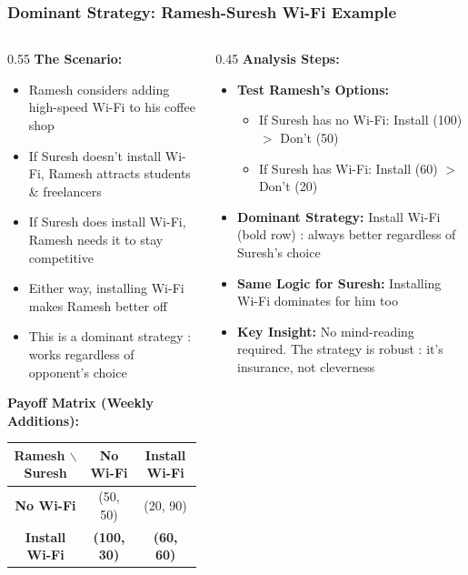 \begin{frame}[fragile]\frametitle{Dominant Strategy: Ramesh-Suresh Wi-Fi Example}
\begin{columns}
    \begin{column}[T]{0.55\linewidth}
      \textbf{The Scenario:}
      \begin{itemize}
        \item Ramesh considers adding high-speed Wi-Fi to his coffee shop
        \item If Suresh doesn't install Wi-Fi, Ramesh attracts students \& freelancers
        \item If Suresh does install Wi-Fi, Ramesh needs it to stay competitive
        \item Either way, installing Wi-Fi makes Ramesh better off
        \item This is a dominant strategy : works regardless of opponent's choice
      \end{itemize}
      
      \vspace{2pt}
      \textbf{Payoff Matrix (Weekly Additions):}
      \begin{center}
      \begin{tabular}{|c|c|c|}
        \hline
        \textbf{Ramesh $\backslash$ Suresh} & \textbf{No Wi-Fi} & \textbf{Install Wi-Fi} \\
        \hline
        \textbf{No Wi-Fi} & (50, 50) & (20, 90) \\
        \hline
        \textbf{\textbf{Install Wi-Fi}} & \textbf{(100, 30)} & \textbf{(60, 60)} \\
        \hline
      \end{tabular}
      \end{center}
    \end{column}
    \begin{column}[T]{0.45\linewidth}
      \textbf{Analysis Steps:}
      \begin{itemize}
        \item \textbf{Test Ramesh's Options:}
        \begin{itemize}
          \item If Suresh has no Wi-Fi: Install (100) $>$ Don't (50)
          \item If Suresh has Wi-Fi: Install (60) $>$ Don't (20)
        \end{itemize}
        \item \textbf{Dominant Strategy:} Install Wi-Fi (bold row) : always better regardless of Suresh's choice
        \item \textbf{Same Logic for Suresh:} Installing Wi-Fi dominates for him too
        \item \textbf{Key Insight:} No mind-reading required. The strategy is robust : it's insurance, not cleverness
      \end{itemize}
    \end{column}
  \end{columns}
\end{frame}

